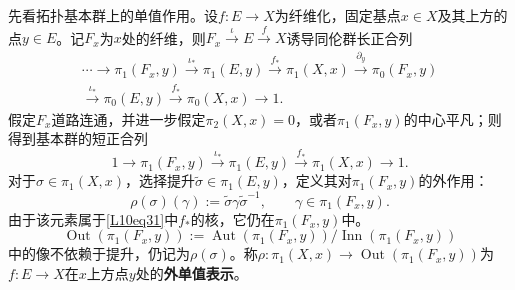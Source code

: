 先看拓扑基本群上的单值作用。设$f:E\to X$为纤维化，固定基点$x\in X$及其上方的点$y\in E$。记$F_x$为$x$处的纤维，则$F_x\xrightarrow{\iota}E\xrightarrow f X$诱导同伦群长正合列
\[\begin{aligned}
\cdots\to\pi_1(F_x,y)\xrightarrow{\iota_*}\pi_1(E,y)\xrightarrow{f_*}\pi_1(X,x)\xrightarrow{\partial_y}\pi_0(F_x,y)\\
\xrightarrow{\iota_*}\pi_0(E,y)\xrightarrow{f_*}\pi_0(X,x)\to1.
\end{aligned}\]
假定$F_x$道路连通，并进一步假定$\pi_2(X,x)=0$，或者$\pi_1(F_x,y)$的中心平凡；则得到基本群的短正合列
\begin{equation}\tag{3.1}\label{L10eq31}
1\to\pi_1(F_x,y)\xrightarrow{\iota_*}\pi_1(E,y)\xrightarrow{f_*}\pi_1(X,x)\to1.
\end{equation}
对于$\sigma\in\pi_1(X,x)$，选择提升$\widetilde\sigma\in\pi_1(E,y)$，定义其对$\pi_1(F_x,y)$的外作用：
\[\rho(\sigma)(\gamma):=\widetilde\sigma\gamma\widetilde\sigma^{-1},\qquad\gamma\in\pi_1(F_x,y).\]
由于该元素属于\eqref{L10eq31}中$f_*$的核，它仍在$\pi_1(F_x,y)$中。
\[\operatorname{Out}(\pi_1(F_x,y)):=\operatorname{Aut}(\pi_1(F_x,y))/\operatorname{Inn}(\pi_1(F_x,y))\]
中的像不依赖于提升，仍记为$\rho(\sigma)$。称$\rho:\pi_1(X,x)\to\operatorname{Out}(\pi_1(F_x,y))$为$f:E\to X$在$x$上方点$y$处的\textbf{外单值表示}。


